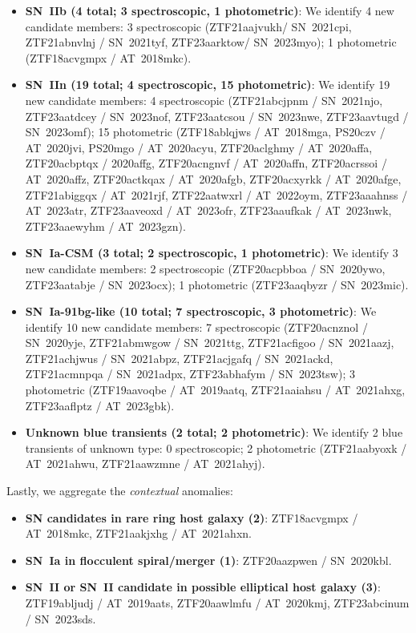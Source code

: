 \documentclass[twocolumn]{aastex63}
\begin{document}
\begin{itemize}
    \item \textbf{SN~IIb (4 total; 3 spectroscopic, 1 photometric)}: We identify 4 new candidate members: 3 spectroscopic (ZTF21aajvukh/ SN~2021cpi, ZTF21abnvlnj / SN~2021tyf, ZTF23aarktow/ SN~2023myo); 1 photometric (ZTF18acvgmpx / AT~2018mkc).
    \item \textbf{SN~IIn (19 total; 4 spectroscopic, 15 photometric)}: We identify 19 new candidate members: 4 spectroscopic (ZTF21abcjpnm / SN~2021njo, ZTF23aatdcey / SN~2023nof, ZTF23aatcsou / SN~2023nwe, ZTF23aavtugd / SN~2023omf); 15 photometric (ZTF18ablqjws / AT~2018mga, PS20czv / AT~2020jvi, PS20mgo / AT~2020acyu, ZTF20aclghmy / AT~2020affa, ZTF20acbptqx / 2020affg, ZTF20acngnvf / AT~2020affn, ZTF20acrssoi / AT~2020affz, ZTF20actkqax / AT~2020afgb, ZTF20acxyrkk / AT~2020afge, ZTF21abiggqx / AT~2021rjf, ZTF22aatwxrl / AT~2022oym, ZTF23aaahnss / AT~2023atr,  ZTF23aaveoxd / AT~2023ofr, ZTF23aaufkak / AT~2023nwk,  ZTF23aaewyhm / AT~2023gzn).
    \item \textbf{SN~Ia-CSM (3 total; 2 spectroscopic, 1 photometric)}: We identify 3 new candidate members: 2 spectroscopic (ZTF20acpbboa / SN~2020ywo, ZTF23aatabje / SN~2023ocx); 1 photometric (ZTF23aaqbyzr / SN~2023mic).
    \item \textbf{SN~Ia-91bg-like (10 total; 7 spectroscopic, 3 photometric)}: We identify 10 new candidate members: 7 spectroscopic (ZTF20acnznol / SN~2020yje, ZTF21abmwgow / SN~2021ttg, ZTF21acfigoo / SN~2021aazj, ZTF21achjwus / SN~2021abpz, ZTF21acjgafq / SN~2021ackd, ZTF21acmnpqa / SN~2021adpx, ZTF23abhafym / SN~2023tsw); 3 photometric (ZTF19aavoqbe / AT~2019aatq, ZTF21aaiahsu / AT~2021ahxg, ZTF23aaflptz / AT~2023gbk).
    \item \textbf{Unknown blue transients (2 total; 2 photometric)}: We identify 2 blue transients of unknown type: 0 spectroscopic; 2 photometric (ZTF21aabyoxk / AT~2021ahwu, ZTF21aawzmne / AT~2021ahyj).    
\end{itemize}

Lastly, we aggregate the \emph{contextual} anomalies:
\begin{itemize}
    \item \textbf{SN candidates in rare ring host galaxy (2)}: ZTF18acvgmpx / AT~2018mkc, ZTF21aakjxhg / AT~2021ahxn.
    \item \textbf{SN~Ia in flocculent spiral/merger (1)}: ZTF20aazpwen / SN~2020kbl.
    \item \textbf{SN~II or SN~II candidate in possible elliptical host galaxy (3)}: ZTF19abljudj / AT~2019aats, ZTF20aawlmfu / AT~2020kmj, ZTF23abcinum / SN~2023sds.
\end{itemize}
\end{document}
